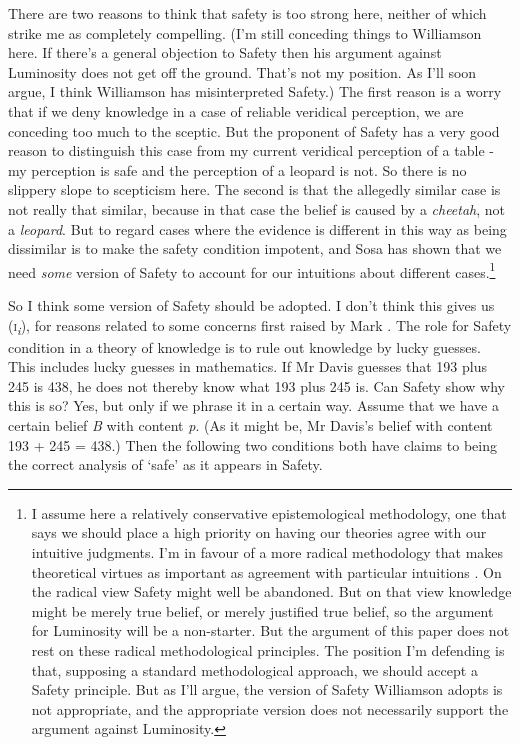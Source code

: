 There are two reasons to think that safety is too strong here, neither of which strike me as completely compelling. (I'm still conceding things to Williamson here. If there's a general objection to Safety then his argument against Luminosity does not get off the ground. That's not my position. As I'll soon argue, I think Williamson has misinterpreted Safety.) The first reason is a worry that if we deny knowledge in a case of reliable veridical perception, we are conceding too much to the sceptic. But the proponent of Safety has a very good reason to distinguish this case from my current veridical perception of a table - my perception is safe and the perception of a leopard is not. So there is no slippery slope to scepticism here. The second is that the allegedly similar case is not really that similar, because in that case the belief is caused by a \textit{cheetah}, not a \textit{leopard}. But to regard cases where the evidence is different in this way as being dissimilar is to make the safety condition impotent, and Sosa has shown that we need \textit{some} version of Safety to account for our intuitions about different cases.\footnote{I assume here a relatively conservative epistemological methodology, one that says we should place a high priority on having our theories agree with our intuitive judgments. I'm in favour of a more radical methodology that makes theoretical virtues as important as agreement with particular intuitions \citet{Weatherson2003-WEAWGA}. On the radical view Safety might well be abandoned. But on that view knowledge might be merely true belief, or merely justified true belief, so the argument for Luminosity will be a non-starter. But the argument of this paper does not rest on these radical methodological principles. The position I'm defending is that, supposing a standard methodological approach, we should accept a Safety principle. But as I'll argue, the version of Safety Williamson adopts is not appropriate, and the appropriate version does not necessarily support the argument against Luminosity.}

So I think some version of Safety should be adopted. I don't think this gives us (\textsc{i}\textit{\textsubscript{i}}), for reasons related to some concerns first raised by Mark \citet{Sainsbury1996}. The role for Safety condition in a theory of knowledge is to rule out knowledge by lucky guesses. This includes lucky guesses in mathematics. If Mr Davis guesses that 193 plus 245 is 438, he does not thereby know what 193 plus 245 is. Can Safety show why this is so? Yes, but only if we phrase it in a certain way. Assume that we have a certain belief \textit{B} with content \textit{p}. (As it might be, Mr Davis's belief with content 193 + 245 = 438.) Then the following two conditions both have claims to being the correct analysis of `safe' as it appears in Safety.

